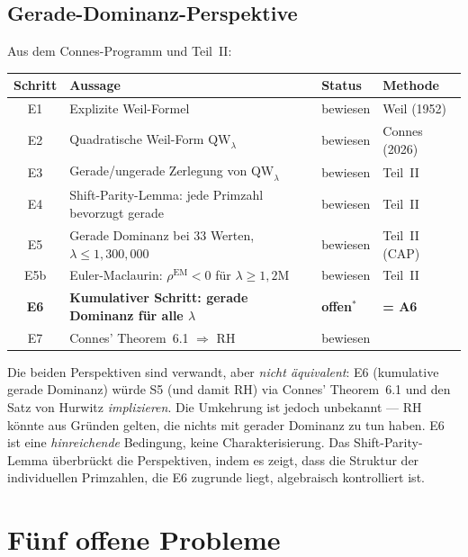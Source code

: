 \documentclass[12pt,a4paper]{article}
\theoremstyle{definition}
\theoremstyle{remark}
\begin{document}
\subsection{Gerade-Dominanz-Perspektive}

Aus dem Connes-Programm und Teil~II:

\begin{center}
\renewcommand{\arraystretch}{1.2}
\begin{tabular}{c|l|l|l}
\textbf{Schritt} & \textbf{Aussage} & \textbf{Status} & \textbf{Methode} \\\hline
E1 & Explizite Weil-Formel & bewiesen & Weil (1952) \\
E2 & Quadratische Weil-Form $\mathrm{QW}_\lambda$ & bewiesen & Connes (2026) \\
E3 & Gerade/ungerade Zerlegung von $\mathrm{QW}_\lambda$ & bewiesen & Teil~II \\
E4 & Shift-Parity-Lemma: jede Primzahl bevorzugt gerade & bewiesen & Teil~II \\
E5 & Gerade Dominanz bei $33$ Werten, $\lambda \leq 1{,}300{,}000$ & bewiesen & Teil~II (CAP) \\
E5b & Euler-Maclaurin: $\rho^{\mathrm{EM}} < 0$ für $\lambda \geq 1{,}2\mathrm{M}$ & bewiesen & Teil~II \\
\textbf{E6} & \textbf{Kumulativer Schritt: gerade Dominanz für alle $\lambda$} & \textbf{offen${}^*$} & \textbf{= A6} \\
E7 & Connes' Theorem~6.1 $\Rightarrow$ RH & bewiesen & \cite{Connes2025}
\end{tabular}
\end{center}

\noindent Die beiden Perspektiven sind verwandt, aber \emph{nicht äquivalent}: E6 (kumulative gerade Dominanz) würde S5 (und damit RH) via Connes' Theorem~6.1 und den Satz von Hurwitz \emph{implizieren}. Die Umkehrung ist jedoch unbekannt --- RH könnte aus Gründen gelten, die nichts mit gerader Dominanz zu tun haben. E6 ist eine \emph{hinreichende} Bedingung, keine Charakterisierung. Das Shift-Parity-Lemma überbrückt die Perspektiven, indem es zeigt, dass die Struktur der individuellen Primzahlen, die E6 zugrunde liegt, algebraisch kontrolliert ist.


\section{Fünf offene Probleme}
\label{sec:open-problems}
\end{document}
